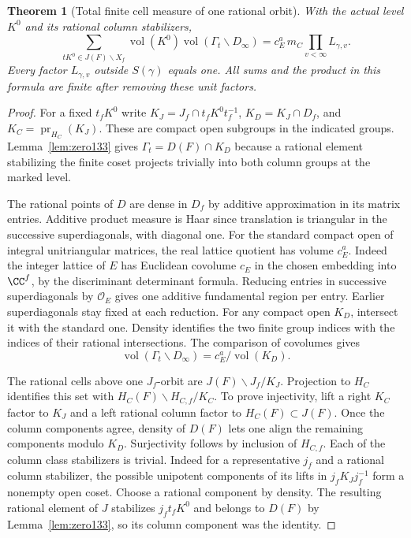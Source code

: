 \documentclass[a4paper,11pt]{article}
\newtheorem{theorem}[proposition]{Theorem}
\theoremstyle{definition}
\theoremstyle{remark}
\numberwithin{equation}{section}
\begin{document}
\begin{theorem}[Total finite cell measure of one rational orbit]
\label{thm:mass205}
With the actual level \(K^0\) and its rational column stabilizers,
\begin{equation}
 \sum_{tK^0\in J(F)\backslash X_f}
    \operatorname{vol}(K^0)\operatorname{vol}
                (\Gamma_t\backslash D_\infty)
       =c_E^a\,m_C\prod_{v<\infty} L_{\gamma,v}.       \label{eq:mass205}
\end{equation}
Every factor \(L_{\gamma,v}\) outside \(S(\gamma)\) equals one.
All sums and the product in this formula are finite after removing
these unit factors.
\end{theorem}
\begin{proof}
For a fixed \(t_fK^0\) write
\(K_J=J_f\cap t_fK^0t_f^{-1}\),
\(K_D=K_J\cap D_f\), and \(K_C=\operatorname{pr}_{H_C}(K_J)\).
These are compact open subgroups in the indicated groups.
Lemma~\ref{lem:zero133} gives
\(\Gamma_t=D(F)\cap K_D\) because a rational element stabilizing
the finite coset projects trivially into both column groups at
the marked level.

The rational points of \(D\) are dense in \(D_f\) by additive
approximation in its matrix entries. Additive product measure is
Haar since translation is triangular in the successive superdiagonals,
with diagonal one. For the standard compact open of integral
unitriangular matrices, the real lattice quotient has volume \(c_E^a\).
Indeed the integer lattice of \(E\) has Euclidean covolume \(c_E\)
in the chosen embedding into \(\CC^f\), by the discriminant
determinant formula. Reducing entries in successive superdiagonals
by \(\mathcal O_E\) gives one additive fundamental region per
entry. Earlier superdiagonals stay fixed at each reduction.
For any compact open \(K_D\), intersect it with the standard one.
Density identifies the two finite group indices with the indices of
their rational intersections. The comparison of covolumes gives
\[
        \operatorname{vol}(\Gamma_t\backslash D_\infty)
                     =c_E^a/\operatorname{vol}(K_D).
\]

The rational cells above one \(J_f\)-orbit are
\(J(F)\backslash J_f/K_J\). Projection to \(H_C\) identifies
this set with \(H_C(F)\backslash H_{C,f}/K_C\). To prove injectivity,
lift a right \(K_C\) factor to \(K_J\) and a left rational column
factor to \(H_C(F)\subset J(F)\). Once the column components agree,
density of \(D(F)\) lets one align the remaining components modulo
\(K_D\). Surjectivity follows by inclusion of \(H_{C,f}\).
Each of the column class stabilizers is trivial. Indeed for a
representative \(j_f\) and a rational column stabilizer, the possible
unipotent components of its lifts in \(j_fK_Jj_f^{-1}\) form a
nonempty open coset. Choose a rational component by density.
The resulting rational element of \(J\) stabilizes \(j_ft_fK^0\)
and belongs to \(D(F)\) by Lemma~\ref{lem:zero133}, so its column
component was the identity.


\end{proof}
\end{document}
